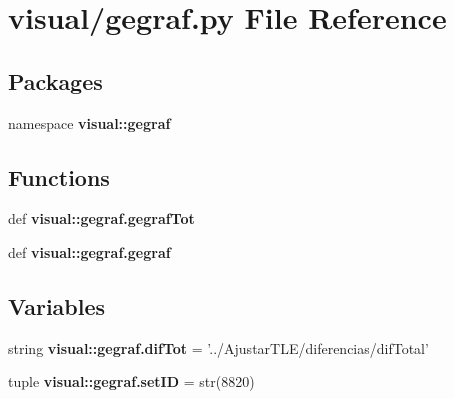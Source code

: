 \section{visual/gegraf.py \-File \-Reference}
\label{gegraf_8py}
\subsection*{\-Packages}
\begin{DoxyCompactItemize}
\item 
namespace {\bf visual\-::gegraf}
\end{DoxyCompactItemize}
\subsection*{\-Functions}
\begin{DoxyCompactItemize}
\item 
def {\bf visual\-::gegraf.\-gegraf\-Tot}
\item 
def {\bf visual\-::gegraf.\-gegraf}
\end{DoxyCompactItemize}
\subsection*{\-Variables}
\begin{DoxyCompactItemize}
\item 
string {\bf visual\-::gegraf.\-dif\-Tot} = '../\-Ajustar\-T\-L\-E/diferencias/dif\-Total'
\item 
tuple {\bf visual\-::gegraf.\-set\-I\-D} = str(8820)
\end{DoxyCompactItemize}
